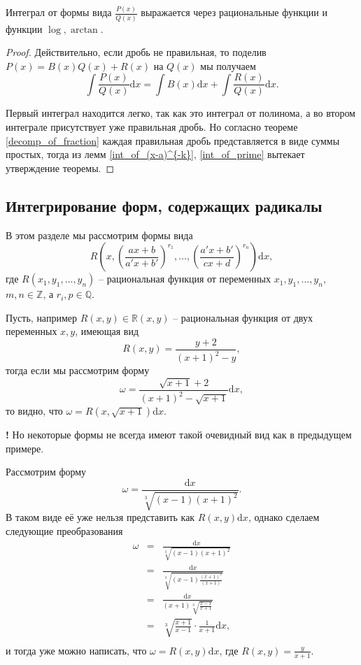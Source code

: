 \begin{theorem}\label{int_of_rational}
    Интеграл от формы вида $\frac{P(x)}{Q(x)}$ выражается через рациональные функции и функции $\log, \arctan.$ 
\end{theorem}

\begin{proof}
    Действительно, если дробь не правильная, то поделив $P(x) = B(x) Q(x) + R(x)$ на $Q(x)$ мы получаем
    \[
     \int \frac{P(x)}{Q(x)}\mathrm{d}x = \int B(x)\mathrm{d}x + \int \frac{R(x)}{Q(x)}\mathrm{d}x.
    \]

Первый интеграл находится легко, так как это интеграл от полинома, а во втором интеграле присутствует уже правильная дробь. Но согласно теореме \ref{decomp_of_fraction} каждая правильная дробь представляется в виде суммы простых, тогда из лемм \ref{int_of_(x-a)^{-k}}, \ref{int_of_prime} вытекает утверждение теоремы.    
\end{proof}

\subsection{Интегрирование форм, содержащих радикалы}

В этом разделе мы рассмотрим формы вида 
\[
 R\left(x, \left(\frac{ax+b}{a'x+b'} \right)^{r_1}, \ldots, \left(\frac{a'x+b'}{cx+d} \right)^{r_n} \right)\mathrm{d}x,
\]
где $R(x_1,y_1,\ldots, y_n)$ -- рациональная функция от переменных $x_1,y_1,\ldots, y_n,$ $m,n \in \mathbb{Z}$, а $r_i, p \in \mathbb{Q}.$ 

\begin{example}
 Пусть, например $R(x,y) \in \mathbb{R}(x,y)$ -- рациональная функция от двух переменных $x,y$, имеющая вид
\[
 R(x,y) = \frac{y+2}{(x+1)^2 -y},
\]
тогда если мы рассмотрим форму
\[
 \omega = \frac{\sqrt{x+1}  +2}{(x+1)^2 - \sqrt{x+1}}\mathrm{d}x,
\]
то видно, что $\omega = R(x, \sqrt{x+1})\mathrm{d}x.$
\end{example}

\begin{mydanger}{\bf !}
    Но некоторые формы не всегда имеют такой очевидный вид как в предыдущем примере.
\end{mydanger}

\begin{example}
    Рассмотрим форму
    \[
     \omega = \frac{\mathrm{d}x}{\sqrt[3]{(x-1)(x+1)^2}}.
    \]
    В таком виде её уже нельзя представить как $R(x,y)\mathrm{d}x$, однако сделаем следующие преобразования
    \begin{eqnarray*}
     \omega  &=&  \frac{\mathrm{d}x}{\sqrt[3]{(x-1)(x+1)^2}} \\
     &=&  \frac{\mathrm{d}x}{\sqrt[3]{(x-1)\frac{(x+1)^3}{(x+1)} }} \\
     &=&  \frac{\mathrm{d}x}{(x+1) {\sqrt[3]{\frac{x-1}{x+1}}}} \\
     &=& \sqrt[3]{\frac{x+1}{x-1}}\cdot \frac{1}{x+1}\mathrm{d}x, \\
    \end{eqnarray*}
и тогда уже можно написать, что $\omega = R(x,y)\mathrm{d}x$, где $R(x,y) = \frac{y}{x+1}$.
\end{example}


